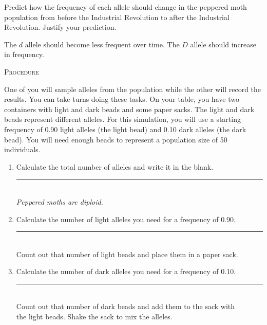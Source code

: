 \documentclass[12pt, hidelinks]{exam}
\newcommand*\AnswerBox[2]{%
    \parbox[t][#1]{0.92\textwidth}{%
    \begin{solution}#2\end{solution}}
    \vspace{\stretch{1}}
}
\newcommand{\allele}[1]{$#1$}
\begin{document}
\begin{questions}

\question\label{ques:selection_prediction}
Predict how the frequency of each allele should change in the peppered moth population from before the Industrial Revolution to after the Industrial Revolution. Justify your prediction.

\AnswerBox{2\baselineskip}{The \allele{d} allele should become less frequent over time. The \allele{D} allele should increase in frequency.}

\newpage

\textsc{Procedure}

\medskip

One of you will sample alleles from the population while the other will record the results. You can take turns doing these tasks.  On your table, you have two containers with light and dark beads and some paper sacks. The light and dark beads represent different alleles. For this simulation, you will use a starting frequency of 0.90 light alleles (the light bead) and 0.10 dark alleles (the dark bead). You will need enough beads to represent a population size of 50 individuals.

\begin{enumerate}

	\item Calculate the total number of alleles and write it in the blank. \hfill \rule{0.5in}{0.4pt}\\ \emph{Peppered moths are diploid.} 
	
	\item Calculate the number of light alleles you need for a frequency of 0.90. \hfill \rule{0.5in}{0.4pt} \\ Count out that number of light beads and place them in a paper sack. 
	
	\item Calculate the number of dark alleles you need for a frequency of 0.10. \hfill \rule{0.5in}{0.4pt} \\ Count out that number of dark beads and add them to the sack with \\
	the light beads. Shake the sack to mix the alleles.
	
	

\end{enumerate}
\end{questions}
\end{document}
